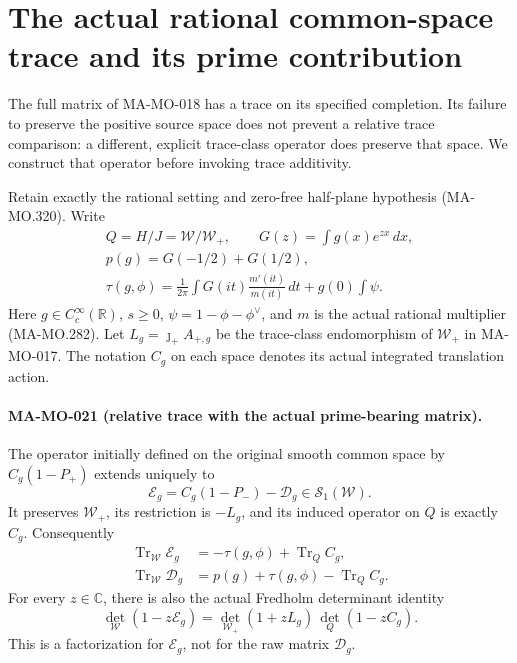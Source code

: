 \section{The actual rational common-space trace and its prime contribution}
\label{sec:polar-relative-trace}

The full matrix of MA-MO-018 has a trace on its specified
completion. Its failure to preserve the positive source space
does not prevent a relative trace comparison: a different,
explicit trace-class operator does preserve that space. We
construct that operator before invoking trace additivity.

Retain exactly the rational setting and zero-free half-plane
hypothesis (MA-MO.320). Write
\[
 \begin{gathered}
 Q=H/J=\mathcal W/\mathcal W_+,\qquad
 G(z)=\int g(x)e^{zx}\,dx,\\
 p(g)=G(-1/2)+G(1/2),\\
 \tau(g,\phi)=\frac1{2\pi}\int G(it)\frac{m'(it)}{m(it)}\,dt
                  +g(0)\int\psi .
 \end{gathered}
 \tag{MA-MO.440}
\]
Here \(g\in C_c^\infty(\mathbb R)\), \(s\ge0\),
\(\psi=1-\phi-\phi^\vee\), and \(m\) is the actual
rational multiplier (MA-MO.282). Let
\(L_g=\jmath_+A_{+,g}\) be the trace-class endomorphism of
\(\mathcal W_+\) in MA-MO-017. The notation \(C_g\) on
each space denotes its actual integrated translation action.

\paragraph{MA-MO-021 (relative trace with the actual prime-bearing matrix).}
The operator initially defined on the original smooth common
space by \(C_g(1-P_+)\) extends uniquely to
\[
 \mathscr E_g=C_g(1-P_-)-\mathscr D_g
                         \in\mathcal S_1(\mathcal W).
 \tag{MA-MO.441}
\]
It preserves \(\mathcal W_+\), its restriction is \(-L_g\),
and its induced operator on \(Q\) is exactly \(C_g\).
Consequently
\[
 \begin{aligned}
 \operatorname{Tr}_{\mathcal W}\mathscr E_g
       &=-\tau(g,\phi)+\operatorname{Tr}_{Q}C_g,\\
 \operatorname{Tr}_{\mathcal W}\mathscr D_g
       &=p(g)+\tau(g,\phi)-\operatorname{Tr}_{Q}C_g.
 \end{aligned}
 \tag{MA-MO.442}
\]
For every \(z\in\mathbb C\), there is also the actual
Fredholm determinant identity
\[
 \det_{\mathcal W}(1-z\mathscr E_g)
   =\det_{\mathcal W_+}(1+zL_g)\,
                       \det_Q(1-zC_g).
 \tag{MA-MO.443}
\]
This is a factorization for \(\mathscr E_g\), not for the
raw matrix \(\mathscr D_g\).

